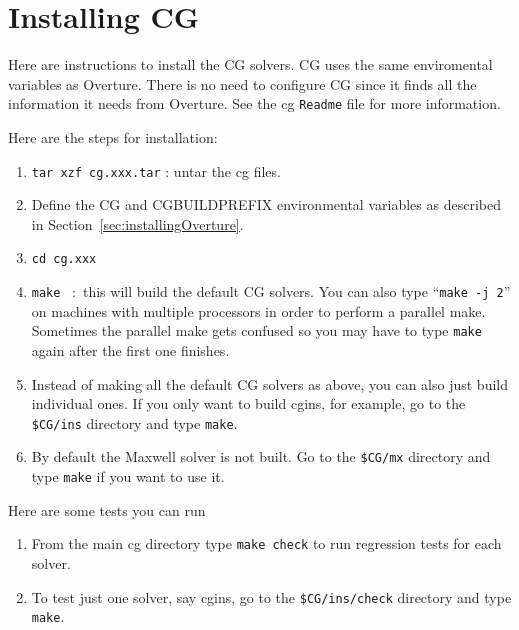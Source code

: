 \documentclass{article}
\begin{document}
\clearpage
\section{Installing CG} \label{sec:installingCG}

Here are instructions to install the CG solvers. CG uses the same enviromental variables 
as Overture. There is no need to configure CG since it finds all the information it
needs from Overture. See the cg {\tt Readme} file for more information. 

\noindent Here are the steps for installation:
\begin{enumerate}
    \item {\tt tar xzf cg.xxx.tar} : untar the cg files. 
    \item Define the CG and CGBUILDPREFIX environmental variables as described in Section~\ref{sec:installingOverture}.
    \item {\tt cd cg.xxx} 
    \item {\tt make} ~:~this will build the default CG solvers.
                 You can also type ``{\tt make -j 2}'' on machines with multiple processors
                 in order to perform a parallel make. Sometimes the parallel make gets
                 confused so you may have to type {\tt make} again after the first one finishes.
    \item Instead of making all the default CG solvers as above, you can also just build individual ones. 
       If you only want to build cgins, for example, go to the {\tt \$CG/ins} directory and type {\tt make}. 
    \item By default the Maxwell solver is not built. Go to the {\tt \$CG/mx} directory and type {\tt make} if you
          want to use it. 
\end{enumerate}

Here are some tests you can run 
\begin{enumerate}
    \item From the main cg directory type {\tt make check} 
     to run regression tests for each solver.
    \item To test just one solver, say cgins, go to the {\tt \$CG/ins/check} directory and type {\tt make}. 
\end{enumerate}
\end{document}
